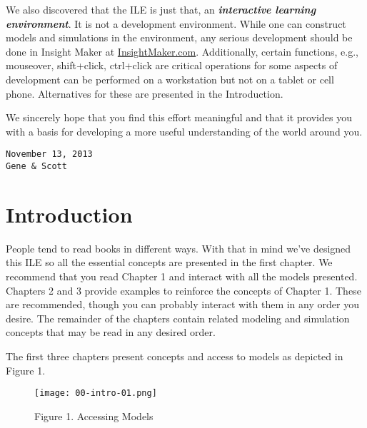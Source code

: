 \documentclass[]{memoir}
\let\Oldincludegraphics\includegraphics
\renewcommand{\includegraphics}[1]{\Oldincludegraphics[max size={\textwidth}{\textheight}]{#1}}
\begin{document}
We also discovered that the ILE is just that, an
\textbf{\emph{interactive learning environment}}. It is not a
development environment. While one can construct models and simulations
in the environment, any serious development should be done in Insight
Maker at \href{http://insightmaker.com/}{InsightMaker.com}.
Additionally, certain functions, e.g., mouseover, shift+click,
ctrl+click are critical operations for some aspects of development can
be performed on a workstation but not on a tablet or cell phone.
Alternatives for these are presented in the Introduction.

We sincerely hope that you find this effort meaningful and that it
provides you with a basis for developing a more useful understanding of
the world around you.

\begin{lstlisting}
November 13, 2013
Gene & Scott
\end{lstlisting}

\section{Introduction}

People tend to read books in different ways. With that in mind we've
designed this ILE so all the essential concepts are presented in the
first chapter. We recommend that you read Chapter 1 and interact with
all the models presented. Chapters 2 and 3 provide examples to reinforce
the concepts of Chapter 1. These are recommended, though you can
probably interact with them in any order you desire. The remainder of
the chapters contain related modeling and simulation concepts that may
be read in any desired order.

The first three chapters present concepts and access to models as
depicted in Figure 1.

\begin{figure}[htbp]
\centering
\texttt{[image: 00-intro-01.png]}
\caption{Figure 1. Accessing Models}
\end{figure}
\end{document}

